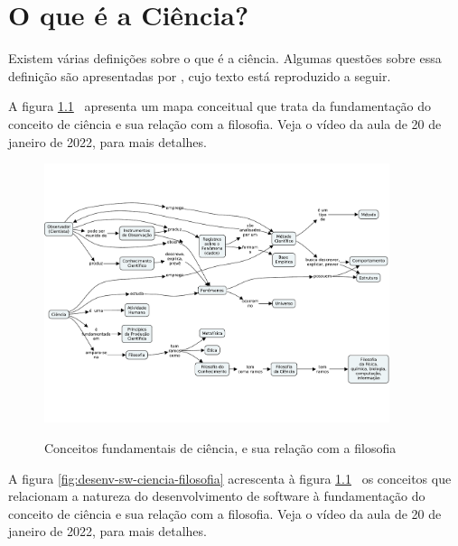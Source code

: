 \chapter{O que é a Ciência?\label{ciência:o:que:eh}}

Existem várias definições sobre o que é a ciência. Algumas questões sobre essa definição são apresentadas por \citep{fernandes_consideracoes_2021}, cujo texto está reproduzido a seguir. 

A figura \ref{fig:ciencia-filosofia}~ apresenta um mapa conceitual que trata da fundamentação do conceito de ciência e sua relação com a filosofia.
Veja o vídeo da aula de 20 de janeiro de 2022, para mais detalhes.

\begin{figure}[ht]
    \centering
    \caption{Conceitos fundamentais de ciência, e sua relação com a filosofia}
    \includegraphics[page=1,angle=90,width=0.9\textwidth,height=0.9\textheight]{1-Introducao/aulas/Ciencia-e-Filosofia.pdf}
    \label{fig:ciencia-filosofia}
\end{figure}

A figura \ref{fig:desenv-sw-ciencia-filosofia} acrescenta à figura  \ref{fig:ciencia-filosofia}~ os conceitos que relacionam a natureza do desenvolvimento de software à  fundamentação do conceito de ciência e sua relação com a filosofia.
Veja o vídeo  da aula de 20 de janeiro de 2022, para mais detalhes.

